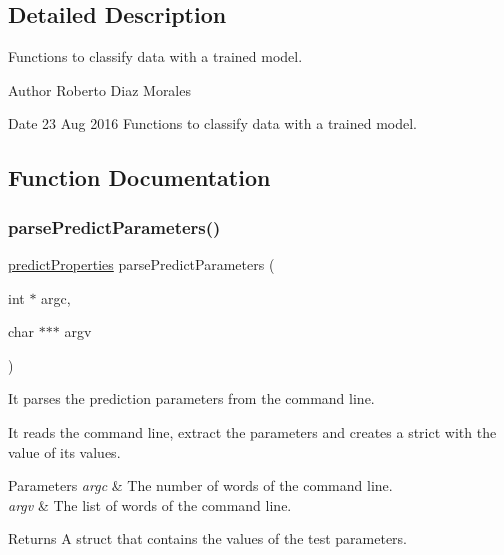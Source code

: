 \subsection{Detailed Description}
Functions to classify data with a trained model. 

\begin{DoxyAuthor}{Author}
Roberto Diaz Morales 
\end{DoxyAuthor}
\begin{DoxyDate}{Date}
23 Aug 2016 Functions to classify data with a trained model. 
\end{DoxyDate}


\subsection{Function Documentation}
\hypertarget{LIBIRWLS-predict_8h_a186e63263bf147110137e90adafcb8c7}{}\label{LIBIRWLS-predict_8h_a186e63263bf147110137e90adafcb8c7} 
\subsubsection{\texorpdfstring{parse\+Predict\+Parameters()}{parsePredictParameters()}}
{\ttfamily \hyperlink{structpredictProperties}{predict\+Properties} parse\+Predict\+Parameters (\begin{DoxyParamCaption}\item[{int $\ast$}]{argc,  }\item[{char $\ast$$\ast$$\ast$}]{argv }\end{DoxyParamCaption})}



It parses the prediction parameters from the command line. 

It reads the command line, extract the parameters and creates a strict with the value of its values. 
\begin{DoxyParams}{Parameters}
{\em argc} & The number of words of the command line. \\
\hline
{\em argv} & The list of words of the command line. \\
\hline
\end{DoxyParams}
\begin{DoxyReturn}{Returns}
A struct that contains the values of the test parameters. 
\end{DoxyReturn}
\hypertarget{LIBIRWLS-predict_8h_ab8c1148238200e9d917c15c40e1fe7e5}{}\label{LIBIRWLS-predict_8h_ab8c1148238200e9d917c15c40e1fe7e5} 
